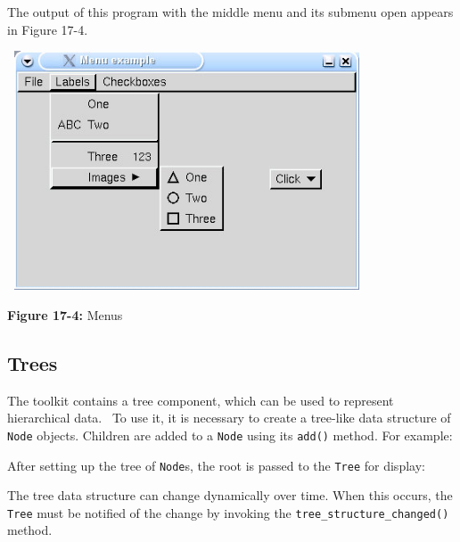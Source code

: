 The output of this program with the middle menu and its submenu open
appears in Figure 17-4.\\

\begin{center}
\includegraphics[width=4.2043in,height=2.7925in]{ub-img/ub-img53.jpg}
\end{center}

{\sffamily\bfseries Figure 17-4:}
{\sffamily Menus}

\subsection{Trees}

The toolkit contains a tree component, which can be used to represent
hierarchical data. \ To use it, it is necessary to create a tree-like
data structure of \texttt{Node} objects. Children are added to a
\texttt{Node} using its \texttt{add()} method. For example:


After setting up the tree of \texttt{Node}s, the root is passed
to the \texttt{Tree} for display:


\noindent The tree data structure can change dynamically over time. When this
occurs, the \texttt{Tree} must be notified of the change by invoking
the \texttt{tree\_structure\_changed()} method.

